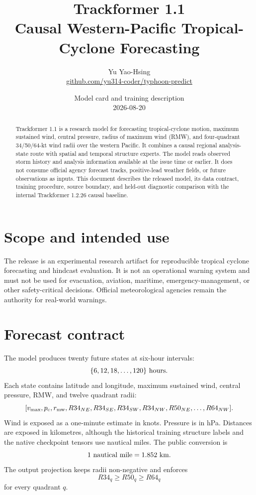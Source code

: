 \documentclass[11pt]{article}
\title{\textbf{Trackformer 1.1}\\
\large Causal Western-Pacific Tropical-Cyclone Forecasting}
\author{Yu Yao-Hsing\\
\small \href{https://github.com/yu314-coder/typhoon-predict}{github.com/yu314-coder/typhoon-predict}}
\date{Model card and training description\\2026-08-20}
\begin{document}
\maketitle

\begin{abstract}
Trackformer 1.1 is a research model for forecasting tropical-cyclone motion,
maximum sustained wind, central pressure, radius of maximum wind (RMW), and
four-quadrant 34/50/64-kt wind radii over the western Pacific.  It combines a
causal regional analysis-state route with spatial and temporal structure
experts.  The model reads observed storm history and analysis information
available at the issue time or earlier.  It does not consume official
agency forecast tracks, positive-lead weather fields, or future observations
as inputs.  This document describes the released model, its data contract,
training procedure, source boundary, and held-out diagnostic comparison with
the internal Trackformer 1.2.26 causal baseline.
\end{abstract}

\section{Scope and intended use}

The release is an experimental research artifact for reproducible tropical
cyclone forecasting and hindcast evaluation.  It is not an operational
warning system and must not be used for evacuation, aviation, maritime,
emergency-management, or other safety-critical decisions.  Official
meteorological agencies remain the authority for real-world warnings.

\section{Forecast contract}

The model produces twenty future states at six-hour intervals:
\[
  \{6,12,18,\ldots,120\}\ {\rm hours}.
\]
Each state contains latitude and longitude, maximum sustained wind, central
pressure, RMW, and twelve quadrant radii:
\[
  [v_{\max},p_{\rm c},r_{\rm mw},R34_{NE},R34_{SE},R34_{SW},R34_{NW},
    R50_{NE},\ldots,R64_{NW}].
\]
Wind is exposed as a one-minute estimate in knots.  Pressure is in hPa.
Distances are exposed in kilometres, although the historical training
structure labels and the native checkpoint tensors use nautical miles.  The
public conversion is
\[
  1\ {\rm nautical\ mile}=1.852\ {\rm km}.
\]
The output projection keeps radii non-negative and enforces
\[
 R34_q \geq R50_q \geq R64_q
\]
for every quadrant \(q\).
\end{document}
